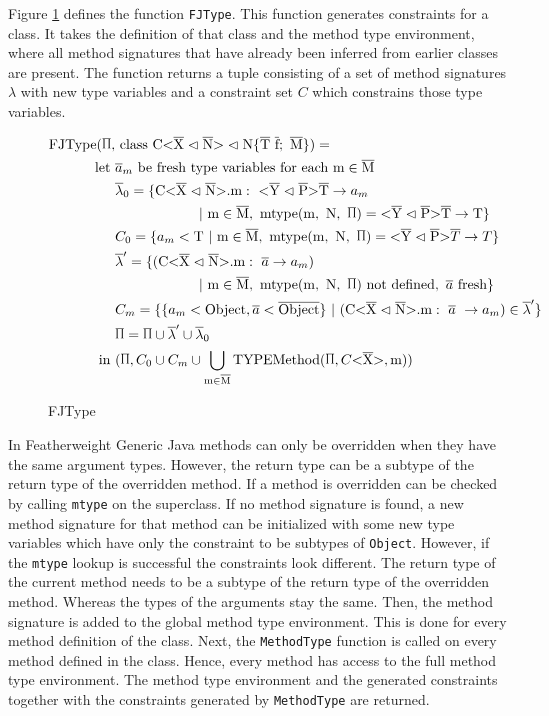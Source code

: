 Figure \ref{fjtype} defines the function \verb|FJType|. This function generates constraints for a class. It takes the definition of that class and the method type environment, where all method signatures that have already been inferred from earlier classes are present.
The function returns a tuple consisting of a set of method signatures $\lambda$ with new type variables and a constraint set $C$ which constrains those type variables.

\begin{figure}[tp]
    \begin{align*}
        \text{FJType}(\sprod{0.7}, & \ \classheader \{ \ot{T} \ \ot{f}; \ \ot{M} \}) = \\
        \text{let} \ & \overline{a}_m \ \text{be fresh type variables for each m} \in \ot{M} \\
        & \overline{\lambda}_0 = \{\cm : \ \yp \ot{T} \to a_m \\
        & \quad \quad \quad \quad \quad \quad | \ \text{m} \in \ot{M}, \ \mtype = \yp \ot{T} \to \text{T} \}\\
        & C_0 = \{ a_m < \text{T} \ | \ \text{m} \in \ot{M}, \ \mtype = \yp \oto{T} \}\\
        & \overline{\lambda}' = \{ ( \cm : \ \overline{a} \to a_m ) \\
        & \quad \quad \quad \quad \quad \quad | \ \text{m} \in \ot{M}, \ \mtype \ \text{not defined}, \ \fresh{\overline{a}} \}\\
        & C_m = \{\{ a_m < \text{Object}, \overline{a} < \ot{Object} \} \ | \ ( \cm : \ \overline{a} \ \to a_m) \in \overline{\lambda}' \} \\
        & \sprod{0.7} = \sprod{0.7} \cup \overline{\lambda}' \cup \overline{\lambda}_0\\
    \text{in} \ &(\sprod{0.7}, C_0 \cup C_m \cup \bigcup_{ \text{m} \in \ot{M} } \text{TYPEMethod}(\sprod{0.7}, C \vv{\ot{X}}, \text{m}))\\
    \end{align*}
    \caption{FJType}
    \label{fjtype}
\end{figure}

In Featherweight Generic Java methods can only be overridden when they have the same argument types. However, the return type can be a subtype of the return type of the overridden method. If a method is overridden can be checked by calling \verb|mtype| on the superclass.
If no method signature is found, a new method signature for that method can be initialized with some new type variables which have only the constraint to be subtypes of \verb|Object|.
However, if the \verb|mtype| lookup is successful the constraints look different. The return type of the current method needs to be a subtype of the return type of the overridden method.
Whereas the types of the arguments stay the same. Then, the method signature is added to the global method type environment.
This is done for every method definition of the class. Next, the \verb|MethodType| function is called on every method defined in the class. Hence, every method has access to the full method type environment.
The method type environment and the generated constraints together with the constraints generated by \verb|MethodType| are returned.

